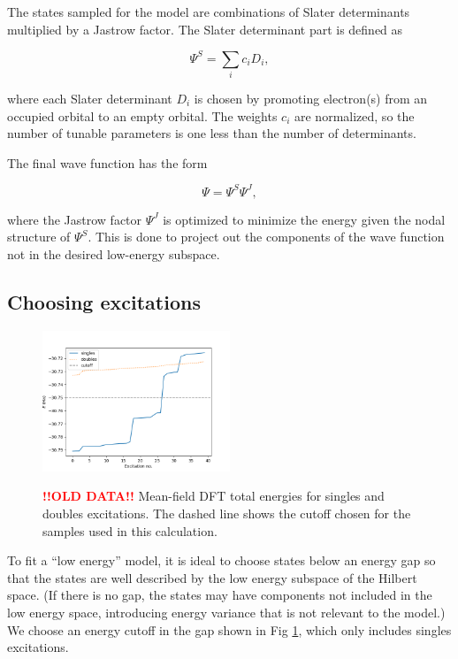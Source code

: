 The states sampled for the model are combinations of Slater determinants multiplied by a Jastrow factor.
The Slater determinant part is defined as

\begin{equation}
\Psi^S = \sum_i c_i D_i,
\end{equation}

where each Slater determinant $D_i$ is chosen by promoting electron(s) from an occupied orbital to an empty orbital.
The weights $c_i$ are normalized, so the number of tunable parameters is one less than the number of determinants.

The final wave function has the form

\begin{equation}
\Psi = \Psi^S \Psi^J,
\end{equation}

where the Jastrow factor $\Psi^J$ is optimized to minimize the energy given the nodal structure of $\Psi^S$.
This is done to project out the components of the wave function not in the desired low-energy subspace.

\subsection{Choosing excitations}

\begin{figure}[h!]
\includegraphics[width=0.5\textwidth]{images/determinant_mf_energies.png}
\label{fig:energy_cutoff}
\caption{\textcolor{red}{\bf !!OLD DATA!!} Mean-field DFT total energies for singles and doubles excitations.
The dashed line shows the cutoff chosen for the samples used in this calculation.}
\end{figure}

To fit a ``low energy'' model, it is ideal to choose states below an energy gap so that the states are well described by the low energy subspace of the Hilbert space.
(If there is no gap, the states may have components not included in the low energy space, introducing energy variance that is not relevant to the model.)
We choose an energy cutoff in the gap shown in Fig \ref{fig:energy_cutoff}, which only includes singles excitations.

